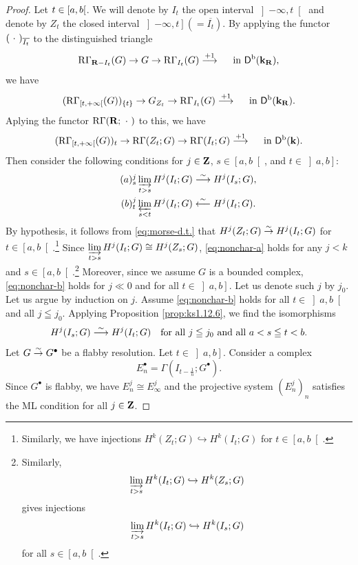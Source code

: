 \begin{proof}
  Let \(t\in \lclosed a,b\ropen\). 
  We will denote by \(I_t\) the open interval \(
      \left]-\infty,t\right[
  \) and denote by \(Z_t\) the closed interval \(
      \left]-\infty,t\right] (= \overline{I_t})
  \).
  By applying the functor \((\blk)_{\overline{I_t}}\) 
  to the distinguished triangle\[
      \RG_{\rr-I_t}(G)\to 
      G\to 
      \RG_{I_t}(G)\overset{+1}{\longrightarrow}
      \quad\text{ in \(\Dompb(\kk_\rr)\)},
  \] we have\[
      (\RG_{[t,+\infty[}(G))_{\{t\}}
      \to G_{Z_t}
      \to 
      \RG_{I_t}(G)
      \overset{+1}{\longrightarrow}
      \quad\text{ in \(\Dompb(\kk_\rr)\)}.
  \]
  Aplying the functor \(\RG(\rr;\blk)\) to this, we have
  \begin{equation}\label{eq:morse-d.t.}
      (\RG_{[t,+\infty[}(G))_{t}
      \to \RG(Z_t;G)
      \to 
      \RG(I_t;G)
      \overset{+1}{\longrightarrow}
      \quad\text{ in \(\Dompb(\kk)\)}.
  \end{equation}
  Then consider the following conditions for 
  \(j\in\zz\), \(s\in\left[a,b\right[\), and 
  \(t\in \left]a,b\right]\):
  \begin{align}
      \tag*{\((a)^j_s\)}\label{eq:nonchar-a}
      \indlim[t>s] H^{j}(I_t;G) &\simarr H^{j}(I_s;G),\\
      \tag*{\((b)^j_t\)}\label{eq:nonchar-b}
      \prolim[s<t] H^{j}(I_t;G) &\simrra H^{j}(I_t;G).
  \end{align}
  By hypothesis, 
  it follows from \eqref{eq:morse-d.t.} that 
  \(
    H^{j}(Z_t;G)\simar H^{j}(I_t;G)
  \) for \(t\in \left[a,b\right[\).\footnote{
    Similarly, we have injections \(
      H^{k}(Z_t;G)\hookrightarrow H^{k}(I_t;G)
  \) for \(t\in \left[a,b\right[\). 
  } 
  Since \(
      \indlim[t>s] H^{j}(I_t;G)\cong H^{j}(Z_s;G)
  \), \ref{eq:nonchar-a} holds 
  for any \(j<k\) and \(s\in\left[a,b\right[\).\footnote{
      Similarly, \[
        \indlim[t>s] H^{k}(I_t;G)\hookrightarrow H^{k}(Z_s;G)
    \] gives injections \[
        \indlim[t>s] H^{k}(I_t;G)\hookrightarrow H^{k}(I_s;G)
    \] for all \(s\in \left[a,b\right[\). 
  } Moreover, since we assume \(G\) is a bounded complex, 
  \ref{eq:nonchar-b} holds for \(j\ll0\) 
  and for all \(t\in \left]a,b\right]\). 
  Let us denote such \(j\) by \(j_0\). 
  Let us argue by induction on \(j\). 
  Assume \ref{eq:nonchar-b} holds for all 
  \(t\in\left]a,b\right[\) and all \(j\leqq j_0\). 
  Applying Proposition \ref{prop:ks1.12.6}, 
  we find the isomorphisms \begin{equation}\label{eq:non-char-init}
    H^{j}(I_s;G) \simarr H^{j}(I_t;G)
    \quad
    \text{for all \(j\leqq j_0\) and all \(a<s\leqq t< b\).}
  \end{equation}
  Let \(G \simar G^{\bullet}\) be a flabby resolution. 
  Let \(t\in\left]a,b\right]\). 
  Consider a complex \[
    E^{\bullet}_{n}=\Gamma(I_{t-\frac{1}{n}};G^{\bullet}).
  \]
  Since \(G^{\bullet}\) is flabby, 
  we have \(E_{n}^{j}\cong E_{\infty}^{j}\) and 
  the projective system \((E^{j}_{n})_{n}\) satisfies 
  the ML condition for all \(j\in\zz\). 
  

\end{proof}
